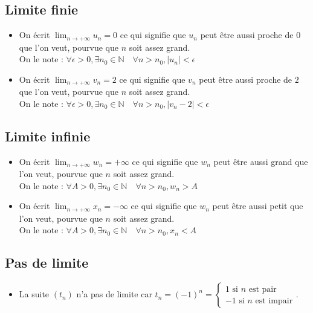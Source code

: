 \documentclass[11pt,a4paper]{article}
\begin{document}
\subsection*{Limite finie}

\begin{itemize}
  \item On écrit $\displaystyle \lim_{n\to+\infty}u_n=0$ ce qui signifie que $u_n$ peut être aussi proche de $0$ que l'on veut, pourvue que $n$ soit assez grand. \\
  On le note : $\forall\epsilon>0,\exists n_0\in\mathbb{N} \quad \forall n>n_0,\left\lvert u_n\right\rvert<\epsilon $
  \item On écrit $\displaystyle \lim_{n\to+\infty}v_n=2$ ce qui signifie que $v_n$ peut être aussi proche de $2$ que l'on veut, pourvue que $n$ soit assez grand. \\
  On le note : $\forall\epsilon>0,\exists n_0\in\mathbb{N} \quad \forall n>n_0,\left\lvert v_n-2\right\rvert<\epsilon $
\end{itemize}

\subsection*{Limite infinie}

\begin{itemize}
  \item On écrit $\displaystyle \lim_{n\to+\infty}w_n=+\infty$ ce qui signifie que $w_n$ peut être aussi grand que l'on veut, pourvue que $n$ soit assez grand. \\
  On le note : $\forall A>0,\exists n_0\in\mathbb{N} \quad \forall n>n_0, w_n>A $
  \item On écrit $\displaystyle \lim_{n\to+\infty}x_n=-\infty$ ce qui signifie que $w_n$ peut être aussi petit que l'on veut, pourvue que $n$ soit assez grand. \\
  On le note : $\forall A>0,\exists n_0\in\mathbb{N} \quad \forall n>n_0, x_n<A $
\end{itemize}


\subsection*{Pas de limite}

\begin{itemize}
  \item La suite $(t_n)$ n'a pas de limite car $t_n=(-1)^n=\left\{
    \begin{array}{l}
      1 \text{ si $n$ est pair} \\
      -1 \text{ si $n$ est impair}
    \end{array}
    \right.$.
\end{itemize}
\end{document}
